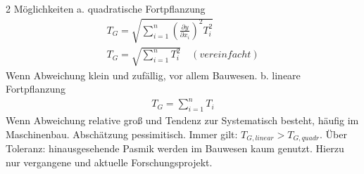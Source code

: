 \documentclass[12pt]{article}
\begin{document}
2 Möglichkeiten\newline
a. quadratische Fortpflanzung
\begin{gather*}
T_G = \sqrt{\sum_{i = 1}^{n} (\frac{\partial y}{\partial x_i})^2 T_i^2} \\
T_G = \sqrt{\sum_{i = 1}^{n} T_i^2} \quad   (vereinfacht)
\end{gather*}
Wenn Abweichung klein und zufällig, vor allem Bauwesen.\newline
\newline
b. lineare Fortpflanzung\newline
\begin{gather*}
T_G = \sum_{i = 1}^{n} T_i
\end{gather*}
Wenn Abweichung relative groß und Tendenz zur Systematisch besteht, häufig im Maschinenbau. Abschätzung pessimitisch.\newline
\newline
Immer gilt: $T_{G,linear} > T_{G,quadr}$.\newline
Über Toleranz: hinausgesehende Pasmik werden im Bauwesen kaum genutzt. Hierzu nur vergangene und aktuelle Forschungsprojekt. 
\end{document}
